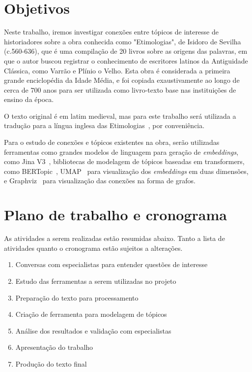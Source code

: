 \documentclass[11pt]{article}
\begin{document}
\section{Objetivos}

Neste trabalho, iremos investigar conexões entre tópicos de interesse de historiadores sobre a obra conhecida como "Etimologias", de Isidoro de Sevilha (c.560-636), que é uma compilação de 20 livros sobre as origens das palavras, em que o autor buscou registrar o conhecimento de escritores latinos da Antiguidade Clássica, como Varrão e Plínio o Velho. Esta obra é considerada a primeira grande enciclopédia da Idade Média, e foi copiada exaustivamente ao longo de cerca de 700 anos para ser utilizada como livro-texto base nas instituições de ensino da época.

O texto original é em latim medieval, mas para este trabalho será utilizada a tradução para a língua inglesa das Etimologias~\cite{barney2006etymologies}, por conveniência.

Para o estudo de conexões e tópicos existentes na obra, serão utilizadas ferramentas como grandes modelos de linguagem para geração de \emph{embeddings}, como Jina V3~\cite{jina}, bibliotecas de modelagem de tópicos baseadas em transformers, como BERTopic~\cite{grootendorst2022bertopic}, UMAP~\cite{mcinnes2018umap} para visualização dos \emph{embeddings} em duas dimensões, e Graphviz~\cite{gansner2000open} para visualização das conexões na forma de grafos.


\section{Plano de trabalho e cronograma}
As atividades a serem realizadas estão resumidas abaixo. Tanto a lista de atividades quanto o cronograma estão sujeitos a alterações.
\begin{enumerate}
    \item Conversas com especialistas para entender questões de interesse
    \item Estudo das ferramentas a serem utilizadas no projeto
    \item Preparação do texto para processamento
    \item Criação de ferramenta para modelagem de tópicos
    \item Análise dos resultados e validação com especialistas
    \item Apresentação do trabalho
    \item Produção do texto final

\end{enumerate}
\end{document}
